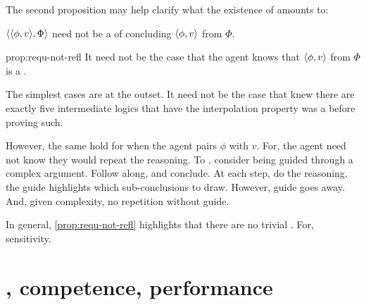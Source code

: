 \begin{note}
  The second proposition may help clarify what the existence of  amounts to:

  \begin{proposition}
    \label{prop:requ-not-refl}
    \(\langle \langle \phi, v \rangle, \Phi \rangle\) need not be a \requ{} of concluding \(\langle \phi, v \rangle\) from \(\Phi\).
  \end{proposition}
  \begin{argument}{prop:requ-not-refl}
    It need not be the case that the agent knows that \(\langle \phi, v \rangle\) from \(\Phi\) is a \fc{}.

    The simplest cases are at the outset.
    It need not be the case that \citeauthor{Maksimova:1977un} knew there are exactly five intermediate logics that have the interpolation property was a \fc{} before proving such.

    However, the same hold for when the agent pairs \(\phi\) with \(v\).
    For, the agent need not know they would repeat the reasoning.
    To , consider being guided through a complex argument.
    Follow along, and conclude.
    At each step, do the reasoning, the guide highlights which sub-conclusions to draw.
    However, guide goes away.
    And, given complexity, no repetition without guide.
  \end{argument}

  In general, \autoref{prop:requ-not-refl} highlights that there are no trivial .
  For, sensitivity.
\end{note}


\section{, competence, performance}
\label{cha:requs:sec:add-illu}

